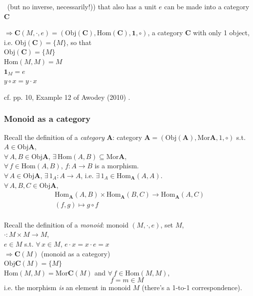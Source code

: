 \begin{itemize}
	\quad \, (but no inverse, necessarily!)) that also has a unit $e$ can be made into a category $\mathbf{C}$ 
	
	$\Longrightarrow \mathbf{C}(M,\cdot ,e) = (\text{Obj}(\mathbf{C}), \text{Hom}(\mathbf{C}), \mathbf{1}, \circ)$, a category $\mathbf{C}$ with only 1 object, i.e. $\text{Obj}(\mathbf{C}) = \lbrace M \rbrace$, so that \\
	$\text{Obj}(\mathbf{C}) = \lbrace M \rbrace$ \\
	$\text{Hom}(M,M) = M$ \\
	$\mathbf{1}_M = e$ \\
	$y \circ x = y \cdot x$
	
	cf. pp. 10, Example 12 of Awodey (2010) \cite{agat:Awod2010}.

\subsubsection{Monoid as a category}

Recall the definition of a \emph{category} $\mathbf{A}$: category $\mathbf{A} = (\text{Obj}(\mathbf{A}), \text{Mor}{\mathbf{A}}, 1, \circ)$ s.t.\\
$A \in \text{Obj}\mathbf{A}$, \\
$\forall \, A, B \in \text{Obj}\mathbf{A}$, $\exists \, \text{Hom}(A,B) \subseteq \text{Mor}\mathbf{A}$, \\
$\forall \, f \in \text{Hom}(A,B)$, $f:A \to B$ is a morphism.\\
$\forall \, A \in \text{Obj}\mathbf{A}$, $\exists \, 1_A : A \to A$, i.e. $\exists \, 1_A \in \text{Hom}_{\mathbf{A}}(A,A)$. \\
$\forall \, A, B, C \in \text{Obj}\mathbf{A}$,  \\
\[
\begin{aligned} 
	& \text{Hom}_{\mathbf{A}}(A, B) \times \text{Hom}_{\mathbf{A}}(B,C) \to \text{Hom}_{\mathbf{A}}(A, C) \\ 
	& (f,g) \mapsto g\circ f \end{aligned} \] \\

Recall the definition of a \emph{monoid}:
monoid $(M, \cdot, e)$, set $M$, \\
$\cdot : M\times M \to M$, \\
$e \in M$ s.t. $\forall \, x \in M$, $e\cdot x = x \cdot e = x$ \\

$\Longrightarrow \mathbf{C}(M)$ (monoid as a category) \\
$\text{Obj}\mathbf{C}(M) = \lbrace M \rbrace$ \\
$\text{Hom}(M, M) = \text{Mor}\mathbf{C}(M)$ and $\forall \, f \in \text{Hom}(M, M)$, 
\[
f = m \in M
\]
i.e. the morphism \emph{is} an element in monoid $M$ (there's a 1-to-1 correspondence).


\end{itemize}

